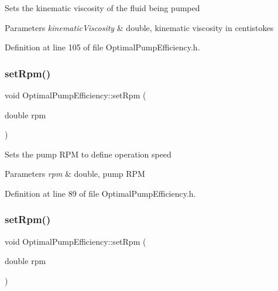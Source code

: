 Sets the kinematic viscosity of the fluid being pumped 
\begin{DoxyParams}{Parameters}
{\em kinematic\+Viscosity} & double, kinematic viscosity in centistokes \\
\hline
\end{DoxyParams}


Definition at line 105 of file Optimal\+Pump\+Efficiency.\+h.

\mbox{\label{class_optimal_pump_efficiency_afc6b6f46b4e289efc8819249ad1c9fb5}} 
\subsubsection{\texorpdfstring{set\+Rpm()}{setRpm()}\hspace{0.1cm}{\footnotesize\ttfamily [1/3]}}
{\footnotesize\ttfamily void Optimal\+Pump\+Efficiency\+::set\+Rpm (\begin{DoxyParamCaption}\item[{double}]{rpm }\end{DoxyParamCaption})\hspace{0.3cm}{\ttfamily [inline]}}

Sets the pump R\+PM to define operation speed 
\begin{DoxyParams}{Parameters}
{\em rpm} & double, pump R\+PM \\
\hline
\end{DoxyParams}


Definition at line 89 of file Optimal\+Pump\+Efficiency.\+h.

\mbox{\label{class_optimal_pump_efficiency_afc6b6f46b4e289efc8819249ad1c9fb5}} 
\subsubsection{\texorpdfstring{set\+Rpm()}{setRpm()}\hspace{0.1cm}{\footnotesize\ttfamily [2/3]}}
{\footnotesize\ttfamily void Optimal\+Pump\+Efficiency\+::set\+Rpm (\begin{DoxyParamCaption}\item[{double}]{rpm }\end{DoxyParamCaption})\hspace{0.3cm}{\ttfamily [inline]}}

